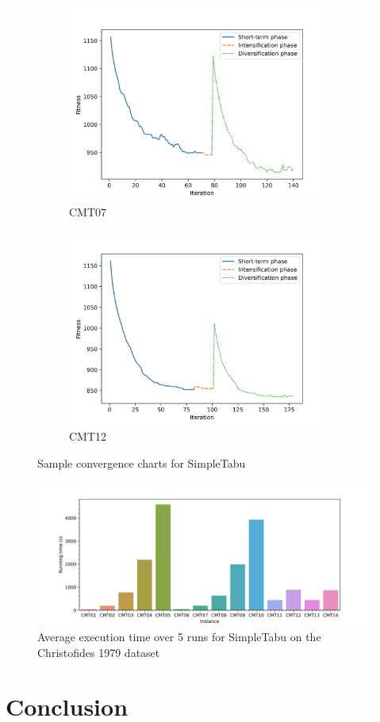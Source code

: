 \documentclass{report}
\begin{document}
\begin{figure}[ht]
    \centering
    \begin{subfigure}[b]{0.49\linewidth}
        \centering
        \includegraphics[width=0.95\textwidth]{images/converge_1.jpg}
        \caption{CMT07}
    \end{subfigure}
    \begin{subfigure}[b]{0.49\linewidth}
        \centering
        \includegraphics[width=0.95\textwidth]{images/converge_2.jpg}
        \caption{CMT12}
    \end{subfigure}
    \caption{Sample convergence charts for SimpleTabu}
\end{figure}

\begin{figure}
    \centering
    \includegraphics[width=\textwidth]{images/runtime_cmt.jpg}
    \caption{Average execution time over 5 runs for SimpleTabu on the Christofides 1979 dataset}
\end{figure}

\chapter{Conclusion}



\end{document}
